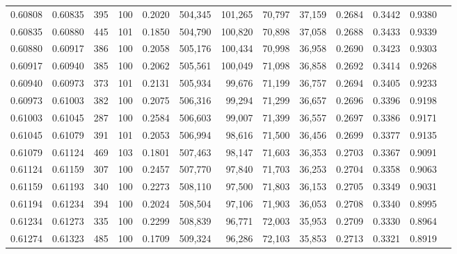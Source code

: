 \begin{tabular}{rrrrrrrrrrrrr}
0.60808 & 0.60835 &   395 & 100 &                                     0.2020 & 504,345 & 101,265 &  70,797 &  37,159 & 0.2684 & 0.3442 & 0.9380 \\
0.60835 & 0.60880 &   445 & 101 &                                     0.1850 & 504,790 & 100,820 &  70,898 &  37,058 & 0.2688 & 0.3433 & 0.9339 \\
0.60880 & 0.60917 &   386 & 100 &                                     0.2058 & 505,176 & 100,434 &  70,998 &  36,958 & 0.2690 & 0.3423 & 0.9303 \\
0.60917 & 0.60940 &   385 & 100 &                                     0.2062 & 505,561 & 100,049 &  71,098 &  36,858 & 0.2692 & 0.3414 & 0.9268 \\
0.60940 & 0.60973 &   373 & 101 &                                     0.2131 & 505,934 &  99,676 &  71,199 &  36,757 & 0.2694 & 0.3405 & 0.9233 \\
0.60973 & 0.61003 &   382 & 100 &                                     0.2075 & 506,316 &  99,294 &  71,299 &  36,657 & 0.2696 & 0.3396 & 0.9198 \\
0.61003 & 0.61045 &   287 & 100 &                                     0.2584 & 506,603 &  99,007 &  71,399 &  36,557 & 0.2697 & 0.3386 & 0.9171 \\
0.61045 & 0.61079 &   391 & 101 &                                     0.2053 & 506,994 &  98,616 &  71,500 &  36,456 & 0.2699 & 0.3377 & 0.9135 \\
0.61079 & 0.61124 &   469 & 103 &                                     0.1801 & 507,463 &  98,147 &  71,603 &  36,353 & 0.2703 & 0.3367 & 0.9091 \\
0.61124 & 0.61159 &   307 & 100 &                                     0.2457 & 507,770 &  97,840 &  71,703 &  36,253 & 0.2704 & 0.3358 & 0.9063 \\
0.61159 & 0.61193 &   340 & 100 &                                     0.2273 & 508,110 &  97,500 &  71,803 &  36,153 & 0.2705 & 0.3349 & 0.9031 \\
0.61194 & 0.61234 &   394 & 100 &                                     0.2024 & 508,504 &  97,106 &  71,903 &  36,053 & 0.2708 & 0.3340 & 0.8995 \\
0.61234 & 0.61273 &   335 & 100 &                                     0.2299 & 508,839 &  96,771 &  72,003 &  35,953 & 0.2709 & 0.3330 & 0.8964 \\
0.61274 & 0.61323 &   485 & 100 &                                     0.1709 & 509,324 &  96,286 &  72,103 &  35,853 & 0.2713 & 0.3321 & 0.8919 \\

\end{tabular}
